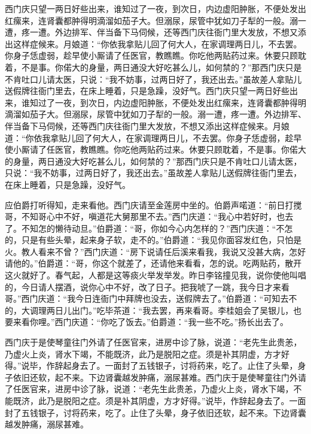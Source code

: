西门庆只望一两日好些出来，谁知过了一夜，到次日，内边虚阳肿胀，不便处发出红瘰来，连肾囊都肿得明滴溜如茄子大。但溺尿，尿管中犹如刀子犁的一般。溺一遭，疼一遭。外边排军、伴当备下马伺候，还等西门庆往衙门里大发放，不想又添出这样症候来。月娘道：“你依我拿贴儿回了何大人，在家调理两日儿，不去罢。你身子恁虚弱，趁早使小厮请了任医官，教瞧瞧。你吃他两贴药过来。休要只顾耽着，不是事。你偌大的身量，两日通没大好吃甚么儿，如何禁的？”那西门庆只是不肯吐口儿请太医，只说：“我不妨事，过两日好了，我还出去。”虽故差人拿贴儿送假牌往衙门里去，在床上睡着，只是急躁，没好气。西门庆只望一两日好些出来，谁知过了一夜，到次日，内边虚阳肿胀，不便处发出红瘰来，连肾囊都肿得明滴溜如茄子大。但溺尿，尿管中犹如刀子犁的一般。溺一遭，疼一遭。外边排军、伴当备下马伺候，还等西门庆往衙门里大发放，不想又添出这样症候来。月娘道：“你依我拿贴儿回了何大人，在家调理两日儿，不去罢。你身子恁虚弱，趁早使小厮请了任医官，教瞧瞧。你吃他两贴药过来。休要只顾耽着，不是事。你偌大的身量，两日通没大好吃甚么儿，如何禁的？”那西门庆只是不肯吐口儿请太医，只说：“我不妨事，过两日好了，我还出去。”虽故差人拿贴儿送假牌往衙门里去，在床上睡着，只是急躁，没好气。

应伯爵打听得知，走来看他。西门庆请至金莲房中坐的。伯爵声喏道：“前日打搅哥，不知哥心中不好，嗔道花大舅那里不去。”西门庆道：“我心中若好时，也去了。不知怎的懒待动旦。”伯爵道：“哥，你如今心内怎样的？”西门庆道：“不怎的，只是有些头晕，起来身子软，走不的。”伯爵道：“我见你面容发红色，只怕是火。教人看来不曾？”西门庆道：“房下说请任后溪来看我，我说又没甚大病，怎好请他的。”伯爵道：“哥，你这个就差了，还请他来看看，怎的说。吃两贴药，散开这火就好了。春气起，人都是这等痰火举发举发。昨日李铭撞见我，说你使他叫唱的，今日请人摆酒，说你心中不好，改了日子。把我唬了一跳，我今日才来看哥。”西门庆道：“我今日连衙门中拜牌也没去，送假牌去了。”伯爵道：“可知去不的，大调理两日儿出门。”吃毕茶道：“我去罢，再来看哥。李桂姐会了吴银儿，也要来看你哩。”西门庆道：“你吃了饭去。”伯爵道：“我一些不吃。”扬长出去了。

西门庆于是使琴童往门外请了任医官来，进房中诊了脉，说道：“老先生此贵恙，乃虚火上炎，肾水下竭，不能既济，此乃是脱阳之症。须是补其阴虚，方才好得。”说毕，作辞起身去了。一面封了五钱银子，讨将药来，吃了。止住了头晕，身子依旧还软，起不来。下边肾囊越发肿痛，溺尿甚难。西门庆于是使琴童往门外请了任医官来，进房中诊了脉，说道：“老先生此贵恙，乃虚火上炎，肾水下竭，不能既济，此乃是脱阳之症。须是补其阴虚，方才好得。”说毕，作辞起身去了。一面封了五钱银子，讨将药来，吃了。止住了头晕，身子依旧还软，起不来。下边肾囊越发肿痛，溺尿甚难。

